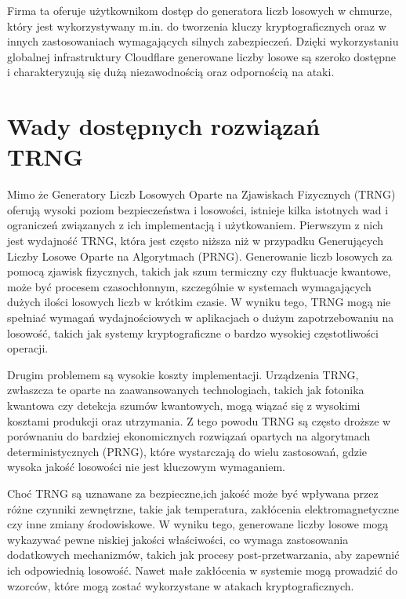 Firma ta oferuje użytkownikom dostęp do generatora liczb losowych w chmurze, który jest wykorzystywany
m.in. do tworzenia kluczy kryptograficznych oraz w innych zastosowaniach wymagających silnych zabezpieczeń.
Dzięki wykorzystaniu globalnej infrastruktury Cloudflare generowane liczby losowe są
szeroko dostępne i charakteryzują się dużą niezawodnością oraz odpornością na ataki.




\section{Wady dostępnych rozwiązań TRNG}\label{sec:wady-dostepnych-rozwiazan-trng}

\iffalse

Mimo że Generatory Liczb Losowych Oparte na Zjawiskach Fizycznych (TRNG) oferują wysoki poziom bezpieczeństwa i losowości,
istnieje kilka istotnych wad i ograniczeń związanych z ich implementacją i użytkowaniem. Pierwszym z nich jest 
wydajność TRNG, która jest często niższa niż w przypadku Generujących Liczby Losowe Oparte na Algorytmach (PRNG).
Generowanie liczb losowych za pomocą zjawisk fizycznych, takich jak szum termiczny czy fluktuacje kwantowe,
może być procesem czasochłonnym, szczególnie w systemach wymagających dużych ilości losowych liczb w krótkim czasie.
W wyniku tego, TRNG mogą nie spełniać wymagań wydajnościowych w aplikacjach o dużym zapotrzebowaniu na losowość,
takich jak systemy kryptograficzne o bardzo wysokiej częstotliwości operacji.

Drugim problemem są wysokie koszty implementacji.
Urządzenia TRNG, zwłaszcza te oparte na zaawansowanych technologiach,
takich jak fotonika kwantowa czy detekcja szumów kwantowych,
mogą wiązać się z wysokimi kosztami produkcji oraz utrzymania.
Z tego powodu TRNG są często droższe w porównaniu do bardziej ekonomicznych rozwiązań opartych na algorytmach deterministycznych (PRNG),
które wystarczają do wielu zastosowań, gdzie wysoka jakość losowości nie jest kluczowym wymaganiem.


Choć TRNG są uznawane za bezpieczne,ich jakość może być wpływana przez różne czynniki zewnętrzne, takie jak temperatura,
zakłócenia elektromagnetyczne czy inne zmiany środowiskowe.
W wyniku tego, generowane liczby losowe mogą wykazywać pewne niskiej jakości właściwości,
co wymaga zastosowania dodatkowych mechanizmów, takich jak procesy post-przetwarzania, aby zapewnić ich odpowiednią losowość.
Nawet małe zakłócenia w systemie mogą prowadzić do wzorców, które mogą zostać wykorzystane w atakach kryptograficznych.


